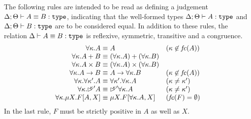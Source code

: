 \documentclass[natbib]{sigplanconf}
\newcommand{\sortType}{\texttt{\textup{type}}}
\newcommand{\delay}[1]{\mathord{\rhd\kern-0.4em^{#1}}}
\begin{document}
The following rules are intended to be read as defining a judgement
$\Delta; \Theta \vdash A \equiv B : \sortType$, indicating that the
well-formed types $\Delta; \Theta \vdash A : \sortType$ and $\Delta;
\Theta \vdash B : \sortType$ are to be considered equal. In addition
to these rules, the relation $\Delta \vdash A \equiv B : \sortType$ is
reflexive, symmetric, transitive and a congruence.
\begin{displaymath}
  \begin{array}{r@{\hspace{0.3em}}c@{\hspace{0.3em}}ll}
    \forall \kappa. A & \equiv & A & (\kappa \not\in \mathit{fc}(A)) \\
    \forall \kappa. A + B & \equiv & (\forall \kappa. A) + (\forall \kappa. B) \\
    \forall \kappa.  A \times B & \equiv & (\forall \kappa. A) \times (\forall \kappa. B) \\
    \forall \kappa. A \to B & \equiv & A \to \forall \kappa. B & (\kappa \not\in \mathit{fc}(A)) \\
    \forall \kappa. \forall \kappa'. A & \equiv & \forall \kappa'. \forall \kappa. A & (\kappa \not= \kappa') \\
    \forall \kappa. \delay\kappa' A & \equiv & \delay\kappa'\forall \kappa. A & (\kappa \not= \kappa') \\
    \forall \kappa. \mu X. F[A,X] & \equiv & \mu X. F[\forall \kappa. A,X] & (\mathit{fc}(F) = \emptyset)
  \end{array}
\end{displaymath}
In the last rule, $F$ must be strictly positive in $A$ as well as $X$.
\end{document}
